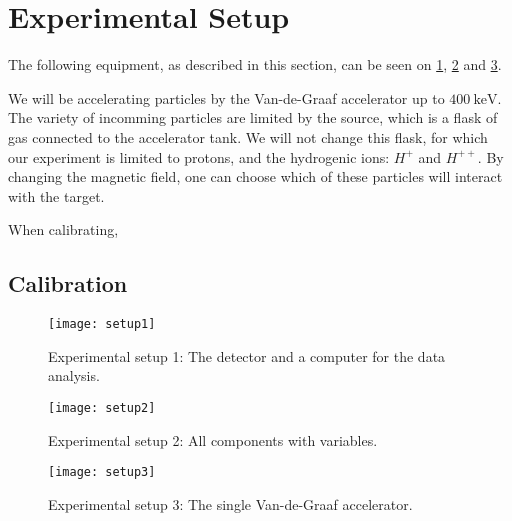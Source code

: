 \section{Experimental Setup}
The following equipment, as described in this section, can be seen on
\cref{fig_setup1}, \cref{fig_setup2} and \cref{fig_setup3}.

We will be accelerating particles by the Van-de-Graaf accelerator up to $
\SI{400}{\kilo\electronvolt}$. The variety of incomming particles are limited
by the source, which is a flask of gas connected to the accelerator tank. We
will not change this flask, for which our experiment is limited to protons, and
the hydrogenic ions: $H^{+}$ and $H^{++}$. By changing the magnetic field, one
can choose which of these particles will interact with the target.

When calibrating, 

\subsection{Calibration}



\begin{figure}[h]
\centering
\texttt{[image: setup1]}
\caption{Experimental setup 1: The detector and a computer for the data
analysis.}
\label{fig_setup1}
\end{figure}

\begin{figure}[h]
\centering
\texttt{[image: setup2]}
\caption{Experimental setup 2: All components with variables.}
\label{fig_setup2}
\end{figure}

\begin{figure}[h]
\centering
\texttt{[image: setup3]}
\caption{Experimental setup 3: The single Van-de-Graaf accelerator.}
\label{fig_setup3}
\end{figure}

